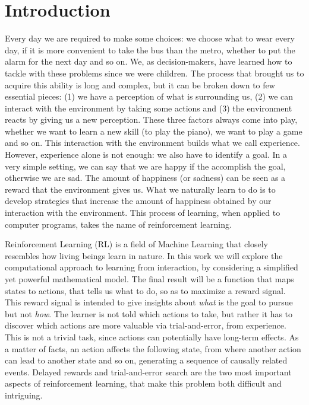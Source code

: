 \chapter{Introduction}
\label{ch:intro}
\thispagestyle{empty}
\setcounter{page}{1}


Every day we are required to make some choices: we choose what to wear every day, if it is more convenient to take the bus than the metro, whether to put the alarm for the next day and so on. We, as decision-makers, have learned how to tackle with these problems since we were children. The process that brought us to acquire this ability is long and complex, but it can be broken down to few essential pieces: (1) we have a perception of what is surrounding us, (2) we can interact with the environment by taking some actions and (3) the environment reacts by giving us a new perception. These three factors always come into play, whether we want to learn a new skill (\eg to play the piano), we want to play a game and so on. This interaction with the environment builds what we call experience. However, experience alone is not enough: we also have to identify a goal. In a very simple setting, we can say that we are happy if the accomplish the goal, otherwise we are sad. The amount of happiness (or sadness) can be seen as a reward that the environment gives us. What we naturally learn to do is to develop strategies that increase the amount of happiness obtained by our interaction with the environment. This process of learning, when applied to computer programs, takes the name of reinforcement learning.



Reinforcement Learning (RL) is a field of Machine Learning that closely resembles how living beings learn in nature. In this work we will explore the computational approach to learning from interaction, by considering a simplified yet powerful mathematical model. The final result will be a function that maps states to actions, that tells us what to do, so as to maximize a reward signal. This reward signal is intended to give insights about \textit{what} is the goal to pursue but not \textit{how}. The learner is not told which actions to take, but rather it has to discover which actions are more valuable via trial-and-error, from experience. \\
This is not a trivial task, since actions can potentially have long-term effects. As a matter of facts, an action affects the following state, from where another action can lead to another state and so on, generating a sequence of causally related events. Delayed rewards and trial-and-error search are the two most important aspects of reinforcement learning, that make this problem both difficult and intriguing.

